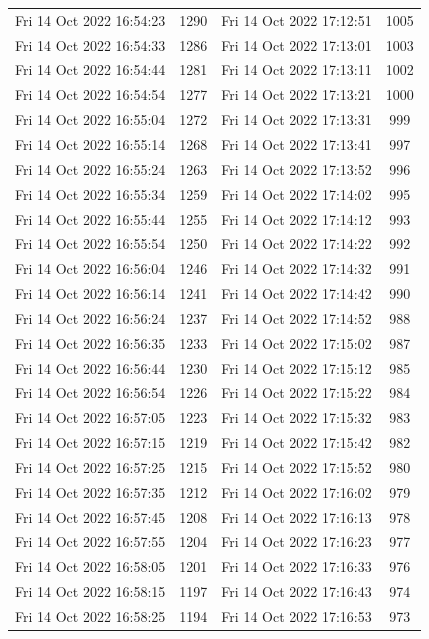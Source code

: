 \documentclass[12pt]{ctexart}
\numberwithin{equation}{section}
\begin{document}
\begin{longtable}{cc|cc}
Fri 14 Oct 2022 16:54:23 & 1290 & Fri 14 Oct 2022 17:12:51 & 1005 \\
Fri 14 Oct 2022 16:54:33 & 1286 & Fri 14 Oct 2022 17:13:01 & 1003 \\
Fri 14 Oct 2022 16:54:44 & 1281 & Fri 14 Oct 2022 17:13:11 & 1002 \\
Fri 14 Oct 2022 16:54:54 & 1277 & Fri 14 Oct 2022 17:13:21 & 1000 \\
Fri 14 Oct 2022 16:55:04 & 1272 & Fri 14 Oct 2022 17:13:31 & 999 \\
Fri 14 Oct 2022 16:55:14 & 1268 & Fri 14 Oct 2022 17:13:41 & 997 \\
Fri 14 Oct 2022 16:55:24 & 1263 & Fri 14 Oct 2022 17:13:52 & 996 \\
Fri 14 Oct 2022 16:55:34 & 1259 & Fri 14 Oct 2022 17:14:02 & 995 \\
Fri 14 Oct 2022 16:55:44 & 1255 & Fri 14 Oct 2022 17:14:12 & 993 \\
Fri 14 Oct 2022 16:55:54 & 1250 & Fri 14 Oct 2022 17:14:22 & 992 \\
Fri 14 Oct 2022 16:56:04 & 1246 & Fri 14 Oct 2022 17:14:32 & 991 \\
Fri 14 Oct 2022 16:56:14 & 1241 & Fri 14 Oct 2022 17:14:42 & 990 \\
Fri 14 Oct 2022 16:56:24 & 1237 & Fri 14 Oct 2022 17:14:52 & 988 \\
Fri 14 Oct 2022 16:56:35 & 1233 & Fri 14 Oct 2022 17:15:02 & 987 \\
Fri 14 Oct 2022 16:56:44 & 1230 & Fri 14 Oct 2022 17:15:12 & 985 \\
Fri 14 Oct 2022 16:56:54 & 1226 & Fri 14 Oct 2022 17:15:22 & 984 \\
Fri 14 Oct 2022 16:57:05 & 1223 & Fri 14 Oct 2022 17:15:32 & 983 \\
Fri 14 Oct 2022 16:57:15 & 1219 & Fri 14 Oct 2022 17:15:42 & 982 \\
Fri 14 Oct 2022 16:57:25 & 1215 & Fri 14 Oct 2022 17:15:52 & 980 \\
Fri 14 Oct 2022 16:57:35 & 1212 & Fri 14 Oct 2022 17:16:02 & 979 \\
Fri 14 Oct 2022 16:57:45 & 1208 & Fri 14 Oct 2022 17:16:13 & 978 \\
Fri 14 Oct 2022 16:57:55 & 1204 & Fri 14 Oct 2022 17:16:23 & 977 \\
Fri 14 Oct 2022 16:58:05 & 1201 & Fri 14 Oct 2022 17:16:33 & 976 \\
Fri 14 Oct 2022 16:58:15 & 1197 & Fri 14 Oct 2022 17:16:43 & 974 \\
Fri 14 Oct 2022 16:58:25 & 1194 & Fri 14 Oct 2022 17:16:53 & 973 \\

\end{longtable}
\end{document}
